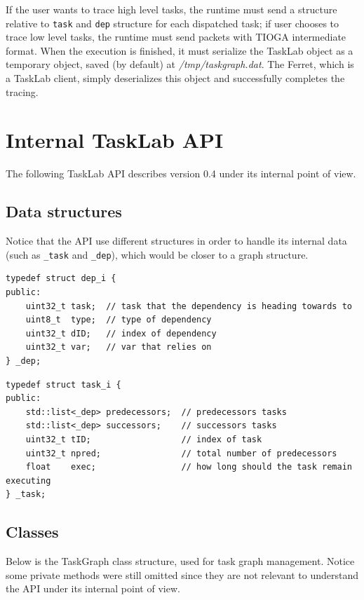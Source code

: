If the user wants to trace high level tasks, the runtime must send a structure relative to \texttt{task} and \texttt{dep} structure for each dispatched task; if user chooses to trace low level tasks, the runtime must send packets with TIOGA \cite{TIOGA} intermediate format. When the execution is finished, it must serialize the TaskLab object as a temporary object, saved (by default) at \textit{/tmp/taskgraph.dat}. The Ferret, which is a TaskLab client, simply deserializes this object and successfully completes the tracing.

\section{Internal TaskLab API}
The following TaskLab API describes version 0.4 under its internal point of view.

\subsection{Data structures}
Notice that the API use different structures in order to handle its internal data (such as \texttt{\_task} and \texttt{\_dep}), which would be closer to a graph structure.

\begin{verbatim}
typedef struct dep_i {
public:
    uint32_t task;  // task that the dependency is heading towards to
    uint8_t  type;  // type of dependency
    uint32_t dID;   // index of dependency
    uint32_t var;   // var that relies on
} _dep;
\end{verbatim}

\begin{verbatim}
typedef struct task_i {
public:
    std::list<_dep> predecessors;  // predecessors tasks
    std::list<_dep> successors;    // successors tasks
    uint32_t tID;                  // index of task
    uint32_t npred;                // total number of predecessors
    float    exec;                 // how long should the task remain executing
} _task;
\end{verbatim}

\subsection{Classes}
Below is the TaskGraph class structure, used for task graph management. Notice some private methods were still omitted since they are not relevant to understand the API under its internal point of view.

